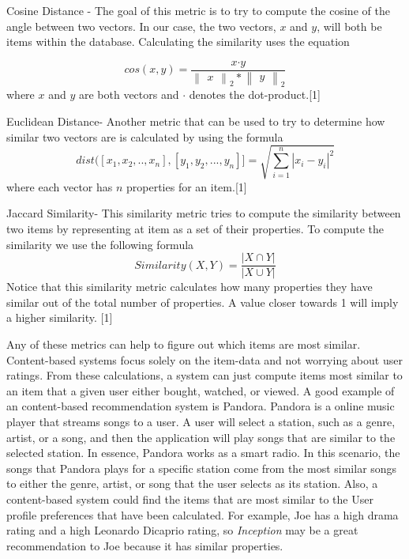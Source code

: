 \documentclass[11pt,reqno]{amsart}
\theoremstyle{definition}
\numberwithin{equation}{subsection}
\begin{document}
Cosine Distance - The goal of this metric is to try to compute the cosine of the angle between two vectors. In our case, the two vectors, $x$ and $y$, will both be items within the database. Calculating the similarity uses the equation

\[
	cos(x,y) =		\frac{x  \boldsymbol{\cdot} y}{\begin{Vmatrix} x \end{Vmatrix}_2 *	\begin{Vmatrix}  y\end{Vmatrix}_2}
\]
where $x$ and $y$ are both vectors and $\boldsymbol{\cdot}$ denotes the dot-product.[1]

Euclidean Distance- Another metric that can be used to try to determine how similar two vectors are is calculated by using the formula
\[
	dist([x_1, x_2,.., x_n], [y_1, y_2,..., y_n]]= \sqrt{\sum_{i=1}^{n} |x_i - y_i|^{2}}
\]
where each vector has $n$ properties for an item.[1]

Jaccard Similarity- This similarity metric tries to compute the similarity between two items by representing at item as a set of their properties. To compute the similarity we use the following formula
\[
	Similarity(X,Y) = \frac{|X \cap Y|}{|X \cup Y|}
\]
Notice that this similarity metric calculates how many properties they have similar out of the total number of properties. A value closer towards 1 will imply a higher similarity. [1]


Any of these metrics can help to figure out which items are most similar. Content-based systems focus solely on the item-data and not worrying about user ratings. From these calculations, a system can just compute items most similar to an item that a given user either bought, watched, or viewed. A good example of an content-based recommendation system is Pandora. Pandora is a online music player that streams songs to a user. A user will select a station, such as a genre, artist, or a song, and then the application will play songs that are similar to the selected station. In essence, Pandora works as a smart radio. In this scenario, the songs that Pandora plays for a specific station come from the most similar songs to either the genre, artist, or song that the user selects as its station. Also, a content-based system could find the items that are most similar to the User profile preferences that have been calculated. For example, Joe has a high drama rating and a high Leonardo Dicaprio rating, so \textit{Inception} may be a great recommendation to Joe because it has similar properties.
\newline
\end{document}
